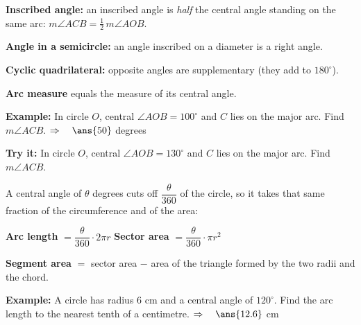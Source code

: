 \documentclass[12pt]{article}
\begin{document}


\begin{formulabox}
\textbf{Inscribed angle:} an inscribed angle is \emph{half} the central angle
standing on the same arc: $m\angle ACB = \tfrac{1}{2}\, m\angle AOB$.\par
\textbf{Angle in a semicircle:} an angle inscribed on a diameter is a right angle.\par
\textbf{Cyclic quadrilateral:} opposite angles are supplementary (they add to $180^\circ$).\par
\textbf{Arc measure} equals the measure of its central angle.
\end{formulabox}

\begin{examplebox}
\textbf{Example:} In circle $O$, central $\angle AOB = 100^\circ$ and $C$ lies on the
major arc. Find $m\angle ACB$.
$\Rightarrow\quad \ans{50}$ degrees
\end{examplebox}

\begin{tryitbox}
\textbf{Try it:} In circle $O$, central $\angle AOB = 130^\circ$ and $C$ lies on the
major arc. Find $m\angle ACB$.\\[2pt]
\end{tryitbox}


\begin{formulabox}
A central angle of $\theta$ degrees cuts off $\dfrac{\theta}{360}$ of the circle,
so it takes that same fraction of the circumference and of the area:\par
\textbf{Arc length} $= \dfrac{\theta}{360}\cdot 2\pi r$ \qquad
\textbf{Sector area} $= \dfrac{\theta}{360}\cdot \pi r^2$\par
\textbf{Segment area} $=$ sector area $-$ area of the triangle formed by the two radii and the chord.
\end{formulabox}

\begin{examplebox}
\textbf{Example:} A circle has radius 6 cm and a central angle of $120^\circ$. Find
the arc length to the nearest tenth of a centimetre.
$\Rightarrow\quad \ans{12.6}$ cm
\end{examplebox}
\end{document}
